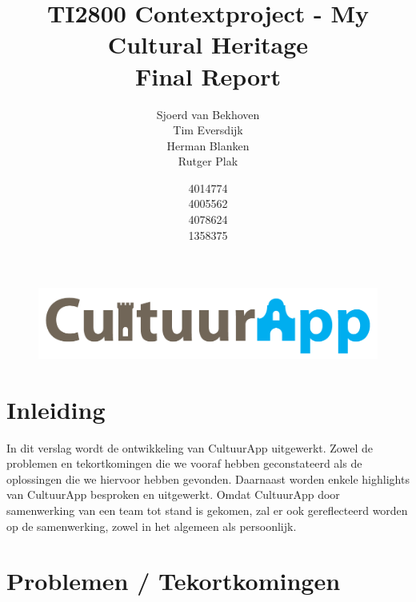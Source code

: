 \documentclass[a4paper,10pt]{article}
\begin{document}
\title{TI2800 Contextproject - My Cultural Heritage\\ Final Report}
\author{Sjoerd van Bekhoven\\ Tim Eversdijk \\ Herman Blanken \\ Rutger Plak \and 4014774 \\ 4005562 \\ 4078624 \\ 1358375}

\maketitle
\setcounter{page}{0}
\thispagestyle{empty}
\vspace{10cm}
		\begin{figure}[ht!]
				\centering
				\includegraphics[width=\textwidth]{cultuurapp-logo.png}
			\end{figure}
\clearpage

\tableofcontents

\clearpage

%
%
%
%
\section{Inleiding}
In dit verslag wordt de ontwikkeling van CultuurApp uitgewerkt. Zowel de problemen en tekortkomingen die we vooraf hebben geconstateerd als de oplossingen die we hiervoor hebben gevonden. Daarnaast worden enkele highlights van CultuurApp besproken en uitgewerkt. Omdat CultuurApp door samenwerking van een team tot stand is gekomen, zal er ook gereflecteerd worden op de samenwerking, zowel in het algemeen als persoonlijk.

%
%
%
%
\section{Problemen / Tekortkomingen}
\end{document}
